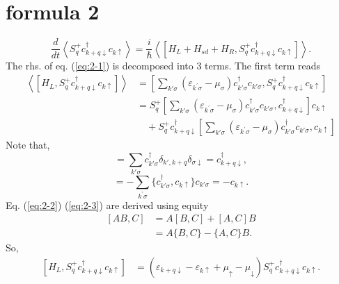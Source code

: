 \documentclass[11pt,a4paper]{article}
\begin{document}
\section{formula 2}
\begin{equation}
\frac{d}{d t}\left\langle S_{q}^{+} c_{k+q \downarrow}^{\dagger} c_{k \uparrow}\right\rangle=\frac{i}{\hbar}\left\langle\left[H_{L}+H_{s d}+H_{R}, S_{q}^{+} c_{k+q \downarrow}^{\dagger} c_{k \uparrow}\right]\right\rangle.
\label{eq:2-1}
\end{equation}
The rhs. of eq. (\ref{eq:2-1}) is decomposed into 3 terms. The first term reads
\begin{equation}
\begin{split}
\left\langle\left[H_{L}, S_{q}^{+} c_{k+q \downarrow}^{\dagger} c_{k \uparrow}\right]\right\rangle &= [\sum_{k'\sigma}\left(\varepsilon_{k^{\prime}\sigma}-\mu_{\sigma}\right) c_{k' \sigma}^{\dagger} c_{k' \sigma}, S_{q}^{+} c_{k+q \downarrow}^{\dagger} c_{k \uparrow}] \\
&= S_{q}^{+} [\sum_{k'\sigma}\left(\varepsilon_{k^{\prime}\sigma}-\mu_{\sigma}\right) c_{k' \sigma}^{\dagger} c_{k' \sigma}, c_{k+q \downarrow}^{\dagger}]c_{k \uparrow} \\
&\quad + S_{q}^{+}c_{k+q \downarrow}^{\dagger}[\sum_{k'\sigma}\left(\varepsilon_{k^{\prime}\sigma}-\mu_{\sigma}\right) c_{k' \sigma}^{\dagger} c_{k' \sigma}, c_{k \uparrow}]
\end{split}
\end{equation}
Note that,
\begin{equation}
[\sum_{k^{\prime} \sigma} c_{k^{\prime} \sigma}^{\dag} c_{k^{\prime} \sigma}, c_{k+q \downarrow}^{\dagger}] = \sum_{k'\sigma} c_{k'\sigma}^{\dag}\delta_{k',k+q}\delta_{\sigma\downarrow} = c_{k+q\downarrow}^{\dag},
\label{eq:2-2}
\end{equation}
\begin{equation}
[\sum_{k^{\prime} \sigma} c_{k^{\prime} \sigma}^{\dag} c_{k^{\prime} \sigma}, c_{k \uparrow}] = - \sum_{k^{\prime} \sigma} \{c_{k'\sigma}^{\dag}, c_{k\uparrow}\}c_{k'\sigma} = - c_{k\uparrow}.
\label{eq:2-3}
\end{equation}
Eq. (\ref{eq:2-2}) (\ref{eq:2-3}) are derived using equity
\begin{equation}
\begin{split}
[AB, C] &= A[B, C] + [A, C]B \\
&= A\{B, C\} - \{A, C\}B.
\end{split}
\end{equation}
So,
\begin{equation}
\begin{split}
\left[H_{L}, S_{q}^{+} c_{k+q \downarrow}^{\dagger} c_{k \uparrow}\right] &= \left(\varepsilon_{k+q \downarrow}-\varepsilon_{k \uparrow}+\mu_{\uparrow}-\mu_{\downarrow}\right)S_{q}^{+} c_{k+q \downarrow}^{\dagger} c_{k \uparrow}.
\end{split}
\label{eq:1-0}
\end{equation}
\end{document}
